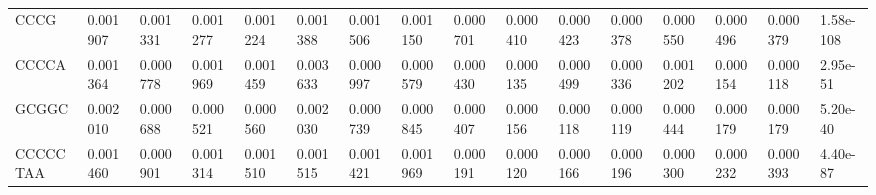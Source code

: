 \begin{samepage}
\begin{table}[h!]
\begin{tabular}{llllllllllllllll}
CCCG           & 0.001907       & 0.001331       & 0.001277       & 0.001224       & 0.001388       & 0.001506       & 0.001150       & 0.000701       & 0.000410       & 0.000423       & 0.000378       & 0.000550       & 0.000496       & 0.000379       & 1.58e-108                          \\
CCCCA          & 0.001364       & 0.000778       & 0.001969       & 0.001459       & 0.003633       & 0.000997       & 0.000579       & 0.000430       & 0.000135       & 0.000499       & 0.000336       & 0.001202       & 0.000154       & 0.000118       & 2.95e-51                           \\
GCGGC          & 0.002010       & 0.000688       & 0.000521       & 0.000560       & 0.002030       & 0.000739       & 0.000845       & 0.000407       & 0.000156       & 0.000118       & 0.000119       & 0.000444       & 0.000179       & 0.000179       & 5.20e-40                           \\
CCCCCTAA       & 0.001460       & 0.000901       & 0.001314       & 0.001510       & 0.001515       & 0.001421       & 0.001969       & 0.000191       & 0.000120       & 0.000166       & 0.000196       & 0.000300       & 0.000232       & 0.000393       & 4.40e-87                           \\
\hline
\end{tabular}
\caption{}
\label{}
\end{table}
\end{samepage}
